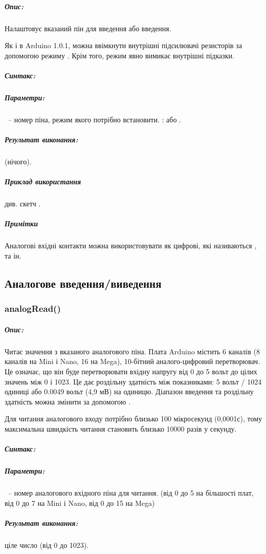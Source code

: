 \documentclass[12pt,a4paper]{report}  %
\begin{document}
\subparagraph{Опис:}

Налаштовує вказаний пін для введення або введення.

Як і в Arduino 1.0.1, можна ввімкнути внутрішні підсилювачі резисторів за допомогою режиму . Крім того, режим  явно вимикає внутрішні підказки.

\subparagraph{Синтакс:} 
\subparagraph{Параметри:}
~-- номер піна, режим якого потрібно встановити.
:  або .

\subparagraph{Результат виконання:}  (нічого).

\subparagraph{Приклад використання} див. скетч \hyperref[digitalwrite]{}.

\subparagraph{Примітки} Аналогові вхідні контакти можна використовувати як цифрові, які називаються ,  та ін.

\subsection{Аналогове введення/виведення}

\subsubsection{analogRead()}

\subparagraph{Опис:}

Читає значення з вказаного аналогового піна. Плата Arduino містить 6 каналів (8 каналів на Mini і Nano, 16 на Mega), 10-бітний аналого-цифровий перетворювач. Це означає, що він буде перетворювати вхідну напругу від 0 до 5 вольт до цілих значень між 0 і 1023. Це дає роздільну здатність між показниками: 5 вольт / 1024 одиниці або 0.0049 вольт (4,9 мВ) на одиницю. Діапазон введення та роздільну здатність можна змінити за допомогою \hyperref[analogReference]{}.

Для читання аналогового входу потрібно близько 100 мікросекунд (0,0001с), тому максимальна швидкість читання становить близько 10000 разів у секунду.

\subparagraph{Синтакс:} 
 
\subparagraph{Параметри:}

~-- номер аналогового вхідного піна для читання. (від 0 до 5 на більшості плат, від 0 до 7 на Mini і Nano, від 0 до 15 на Mega)

\subparagraph{Результат виконання:} ціле число  (від 0 до 1023).
\end{document}
